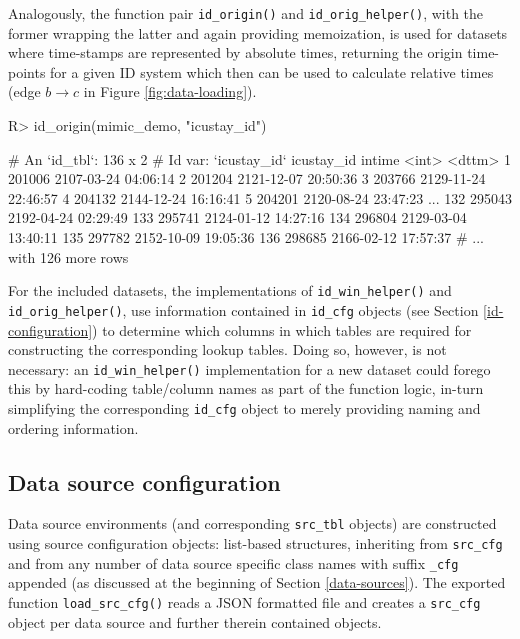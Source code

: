 \documentclass[
  notitle,
  nojss,
  noheadings]{jss}
\begin{document}
Analogously, the function pair \texttt{id\_origin()} and
\texttt{id\_orig\_helper()}, with the former wrapping the latter and
again providing memoization, is used for datasets where time-stamps are
represented by absolute times, returning the origin time-points for a
given ID system which then can be used to calculate relative times (edge
\(b \to c\) in Figure \ref{fig:data-loading}).

\begin{CodeChunk}
\begin{CodeInput}
R> id_origin(mimic_demo, "icustay_id")
\end{CodeInput}
\begin{CodeOutput}
# An `id_tbl`: 136 x 2
# Id var:      `icustay_id`
    icustay_id intime
         <int> <dttm>
  1     201006 2107-03-24 04:06:14
  2     201204 2121-12-07 20:50:36
  3     203766 2129-11-24 22:46:57
  4     204132 2144-12-24 16:16:41
  5     204201 2120-08-24 23:47:23
...
132     295043 2192-04-24 02:29:49
133     295741 2124-01-12 14:27:16
134     296804 2129-03-04 13:40:11
135     297782 2152-10-09 19:05:36
136     298685 2166-02-12 17:57:37
# ... with 126 more rows
\end{CodeOutput}
\end{CodeChunk}

For the included datasets, the implementations of
\texttt{id\_win\_helper()} and \texttt{id\_orig\_helper()}, use
information contained in \texttt{id\_cfg} objects (see Section
\ref{id-configuration}) to determine which columns in which tables are
required for constructing the corresponding lookup tables. Doing so,
however, is not necessary: an \texttt{id\_win\_helper()} implementation
for a new dataset could forego this by hard-coding table/column names as
part of the function logic, in-turn simplifying the corresponding
\texttt{id\_cfg} object to merely providing naming and ordering
information.

\hypertarget{data-source-configuration}{%
\subsection{Data source configuration}\label{data-source-configuration}}

Data source environments (and corresponding \texttt{src\_tbl} objects)
are constructed using source configuration objects: list-based
structures, inheriting from \texttt{src\_cfg} and from any number of
data source specific class names with suffix \texttt{\_cfg} appended (as
discussed at the beginning of Section \ref{data-sources}). The exported
function \texttt{load\_src\_cfg()} reads a JSON formatted file and
creates a \texttt{src\_cfg} object per data source and further therein
contained objects.
\end{document}
